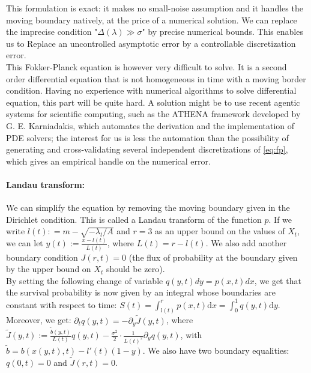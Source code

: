 \documentclass[12pt,a4paper]{article}
\theoremstyle{definition}
\theoremstyle{plain}
\newcommand{\dd}{\mathrm{d}}
\begin{document}
\noindent This formulation is exact: it makes no small-noise assumption and it handles the moving
boundary natively, at the price of a numerical solution. We can replace the imprecise condition "$\Delta(\lambda) \gg \sigma$" by precise numerical bounds. This enables us to Replace an uncontrolled asymptotic error by a controllable discretization
error. \\

\noindent This Fokker-Planck equation is however very difficult to solve. It is a second order differential equation that is not homogeneous in time with a moving border condition. Having no experience with numerical algorithms to solve differential equation, this part will be quite hard. A solution might be to use recent agentic systems for scientific computing, such as
the ATHENA framework developed by G. E. Karniadakis, which automates the derivation
and the implementation of PDE solvers; the interest for us is less the automation than the
possibility of generating and cross-validating several independent discretizations of
\eqref{eq:fp}, which gives an empirical handle on the numerical error. \\

\paragraph{Landau transform:} We can simplify the equation by removing the moving boundary given in the Dirichlet condition. This is called a Landau transform of the function $p$. If we write $l(t) : = m - \sqrt{-\lambda_t / A}$ and $r=3$ as an upper bound on the values of $X_t$, we can let $y(t) := \frac{x - l(t)}{L(t)}$, where $L(t) = r - l(t)$. We also add another boundary condition $J(r,t) = 0$ (the flux of probability at the boundary given by the upper bound on $X_t$ should be zero). \\

\noindent By setting the following change of variable $q(y,t)dy = p(x,t)dx$, we get that the survival probability is now given by an integral whose boundaries are constant with respect to time: $S(t) = \int_{l(t)}^r p(x,t) \dd x = \int_0^1 q(y, t) \dd y$. \\

\noindent Moreover, we get: $\partial_t q(y, t) = - \partial_y \tilde{J}(y,t)$, where $\tilde{J}(y,t) := \frac{\tilde{b}(y,t)}{L(t)} q(y,t) - \frac{\sigma^2}{2} \cdot \frac{1}{L(t)^2} \partial_y q(y,t)$, with $\tilde{b} = b(x(y,t), t) - l'(t)(1-y)$.  We also have two boundary equalities: $q(0,t) = 0$ and $\tilde{J}(r,t) = 0$. \\
\end{document}
